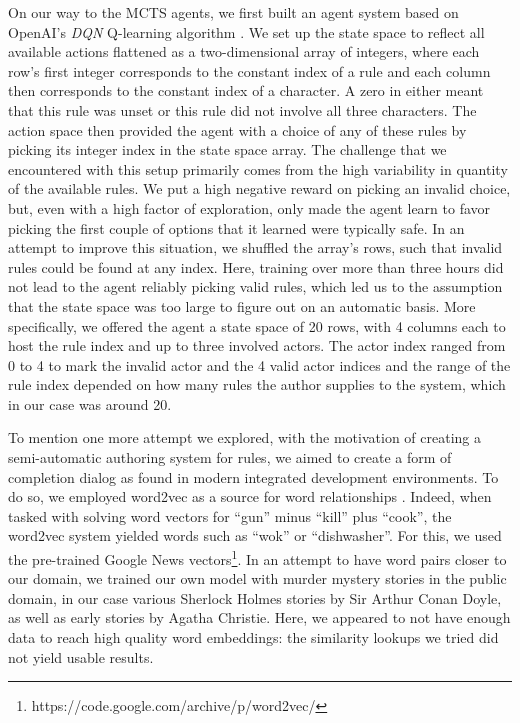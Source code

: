 On our way to the MCTS agents, we first built an agent system based on OpenAI's \emph{DQN} Q-learning algorithm \cite{baselines}. We set up the state space to reflect all available actions flattened as a two-dimensional array of integers, where each row's first integer corresponds to the constant index of a rule and each column then corresponds to the constant index of a character. A zero in either meant that this rule was unset or this rule did not involve all three characters. The action space then provided the agent with a choice of any of these rules by picking its integer index in the state space array. The challenge that we encountered with this setup primarily comes from the high variability in quantity of the available rules. We put a high negative reward on picking an invalid choice, but, even with a high factor of exploration, only made the agent learn to favor picking the first couple of options that it learned were typically safe. In an attempt to improve this situation, we shuffled the array's rows, such that invalid rules could be found at any index. Here, training over more than three hours did not lead to the agent reliably picking valid rules, which led us to the assumption that the state space was too large to figure out on an automatic basis. More specifically, we offered the agent a state space of 20 rows, with 4 columns each to host the rule index and up to three involved actors. The actor index ranged from 0 to 4 to mark the invalid actor and the 4 valid actor indices and the range of the rule index depended on how many rules the author supplies to the system, which in our case was around 20.

To mention one more attempt we explored, with the motivation of creating a semi-automatic authoring system for rules, we aimed to create a form of completion dialog as found in modern integrated development environments.
To do so, we employed word2vec as a source for word relationships \cite{Mikolov2013EfficientEO}.
Indeed, when tasked with solving word vectors for \enquote{gun} minus \enquote{kill} plus \enquote{cook}, the word2vec system yielded words such as \enquote{wok} or \enquote{dishwasher}.
For this, we used the pre-trained Google News vectors\footnote{https://code.google.com/archive/p/word2vec/}.
In an attempt to have word pairs closer to our domain, we trained our own model with murder mystery stories in the public domain, in our case various Sherlock Holmes stories by Sir Arthur Conan Doyle, as well as early stories by Agatha Christie. Here, we appeared to not have enough data to reach high quality word embeddings: the similarity lookups we tried did not yield usable results.

